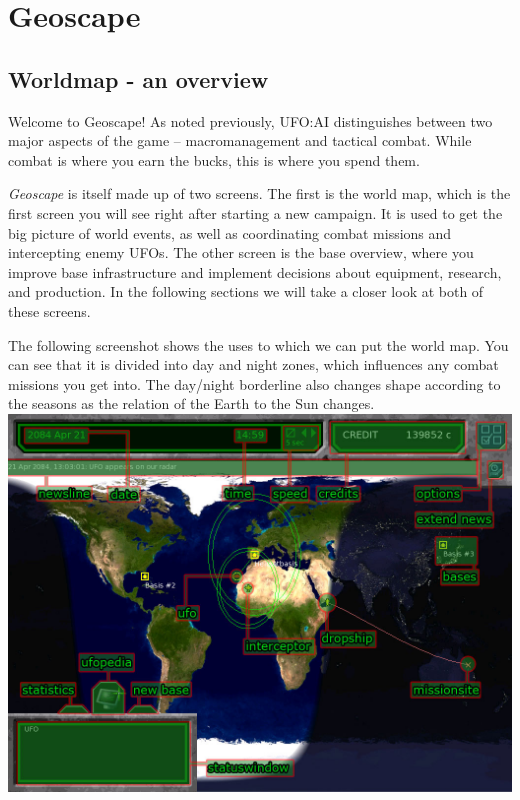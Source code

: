 \section{Geoscape}

\subsection{Worldmap - an overview}
Welcome to Geoscape! As noted previously, UFO:AI distinguishes between two major aspects of the game -- macromanagement and tactical combat. While combat is where you earn the bucks, this is where you spend them.

\emph{Geoscape} is itself made up of two screens. The first is the world map, which is the first screen you will see right after starting a new campaign. It is used to get the big picture of world events, as well as coordinating combat missions and intercepting enemy UFOs. The other screen is the base overview, where you improve base infrastructure and implement decisions about equipment, research, and production. In the following sections we will take a closer look at both of these screens.

The following screenshot shows the uses to which we can put the world map. You can see that it is divided into day and night zones, which influences any combat missions you get into.  The day/night borderline also changes shape according to the seasons as the relation of the Earth to the Sun changes.\\

\includegraphics[width=\textwidth]{images/geoscape_final.jpg}


